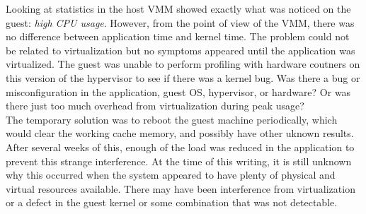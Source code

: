 \indent Looking at statistics in the host VMM showed exactly what was noticed on the guest:  \emph{high CPU usage}.   However, from the point of view of the VMM, there was no difference between application time and kernel time.  The problem could not be related to virtualization but no symptoms appeared until the application was virtualized.  The guest was unable to perform profiling with hardware coutners on this version of the hypervisor \cite{serebrin} to see if there was a kernel bug.  Was there a bug or misconfiguration in the application, guest OS, hypervisor, or hardware?  Or was there just too much overhead from virtualization during peak usage? \\
\indent The temporary solution was to reboot the guest machine periodically, which would clear the working cache memory, and possibly have other uknown results.  After several weeks of this, enough of the load was reduced in the application to prevent this strange interference.  At the time of this writing, it is still unknown why this occurred when the system appeared to have plenty of physical and virtual resources available. There may have been interference from virtualization or a defect in the guest kernel or some combination that was not detectable. 

